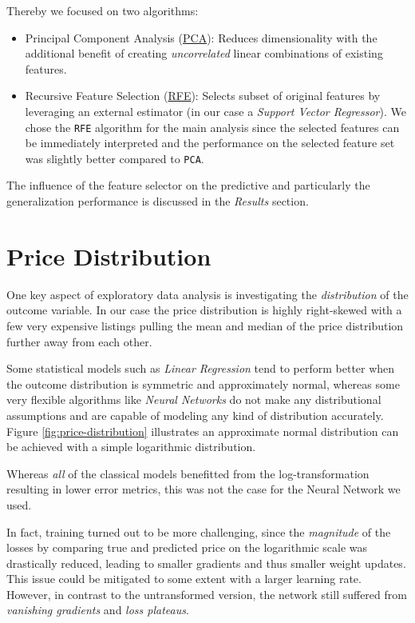 \documentclass[12pt, letterpaper]{article}
\begin{document}
Thereby we focused on two algorithms:
\begin{itemize}
    \item Principal Component Analysis (\href{https://scikit-learn.org/stable/modules/generated/sklearn.decomposition.PCA.html}{PCA}):
          Reduces dimensionality with the additional benefit of creating \emph{uncorrelated} linear combinations of existing features.
    \item Recursive Feature Selection (\href{https://scikit-learn.org/stable/modules/generated/sklearn.feature_selection.RFE.html}{RFE}):
          Selects subset of original features by leveraging an external estimator (in our case a \emph{Support Vector Regressor}).
          We chose the \texttt{RFE} algorithm for the main analysis since the selected features can be immediately interpreted and the performance on the selected feature set was slightly better compared to \texttt{PCA}.

\end{itemize}

The influence of the feature selector on the predictive and particularly the generalization performance is discussed in the \emph{Results} section.


\section{Price Distribution}

One key aspect of exploratory data analysis is investigating the \emph{distribution} of the outcome variable.
In our case the price distribution is highly right-skewed with a few very expensive listings pulling the mean and median of the price distribution further away from each other.

Some statistical models such as \emph{Linear Regression} tend to perform better when the outcome distribution is symmetric and approximately normal, whereas some very flexible algorithms like \emph{Neural Networks} do not make any distributional assumptions and are capable of modeling any kind of distribution accurately.
Figure \ref{fig:price-distribution} illustrates an approximate normal distribution can be achieved with a simple logarithmic distribution.

Whereas \emph{all} of the classical models benefitted from the log-transformation resulting in lower error metrics, this was not the case for the Neural Network we used.

In fact, training turned out to be more challenging, since the \emph{magnitude} of the losses by comparing true and predicted price on the logarithmic scale was drastically reduced, leading to smaller gradients and thus smaller weight updates.
This issue could be mitigated to some extent with a larger learning rate.
However, in contrast to the untransformed version, the network still suffered from \emph{vanishing gradients} and \emph{loss plateaus}.
\end{document}
